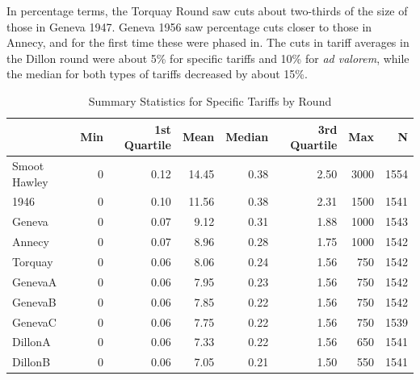 \documentclass[
  12pt,
]{article}
\begin{document}
In percentage terms, the Torquay Round saw cuts about two-thirds of the size of those in Geneva 1947. Geneva 1956 saw percentage cuts closer to those in Annecy, and for the first time these were phased in. The cuts in tariff averages in the Dillon round were about 5\% for specific tariffs and 10\% for \emph{ad valorem}, while the median for both types of tariffs decreased by about 15\%.

\begin{table}[!h]

\caption{\label{tab:sp-sm-db}Summary Statistics for Specific Tariffs by Round}
\centering
\begin{tabular}[t]{lrrrrrrr}
\toprule
  & Min & 1st Quartile & Mean & Median & 3rd Quartile & Max & N\\
\midrule
Smoot Hawley & 0 & 0.12 & 14.45 & 0.38 & 2.50 & 3000 & 1554\\
1946 & 0 & 0.10 & 11.56 & 0.38 & 2.31 & 1500 & 1541\\
Geneva & 0 & 0.07 & 9.12 & 0.31 & 1.88 & 1000 & 1543\\
Annecy & 0 & 0.07 & 8.96 & 0.28 & 1.75 & 1000 & 1542\\
Torquay & 0 & 0.06 & 8.06 & 0.24 & 1.56 & 750 & 1542\\
\addlinespace
GenevaA & 0 & 0.06 & 7.95 & 0.23 & 1.56 & 750 & 1542\\
GenevaB & 0 & 0.06 & 7.85 & 0.22 & 1.56 & 750 & 1542\\
GenevaC & 0 & 0.06 & 7.75 & 0.22 & 1.56 & 750 & 1539\\
DillonA & 0 & 0.06 & 7.33 & 0.22 & 1.56 & 650 & 1541\\
DillonB & 0 & 0.06 & 7.05 & 0.21 & 1.50 & 550 & 1541\\
\bottomrule
\end{tabular}
\end{table}
\end{document}
